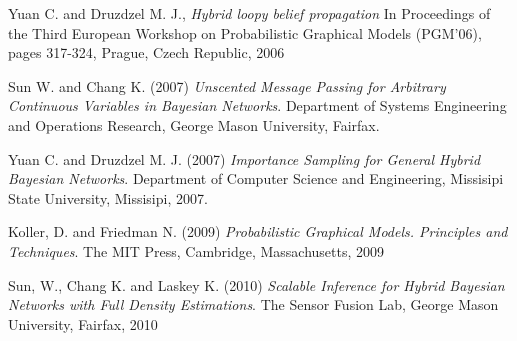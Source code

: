 \documentclass[a4paper,11pt]{article}
\begin{document}
\begin{thebibliography}{}
Yuan C. and Druzdzel M. J., \textit{Hybrid loopy belief propagation} In Proceedings of the Third European Workshop on Probabilistic Graphical Models (PGM'06), pages 317-324, Prague, Czech Republic, 2006

Sun W. and Chang K. (2007) \textit{Unscented Message Passing for Arbitrary Continuous Variables in Bayesian Networks}. Department of Systems Engineering and Operations Research, George Mason University, Fairfax.

Yuan C. and Druzdzel M. J. (2007) \textit{Importance Sampling for General Hybrid Bayesian Networks}. Department of Computer Science and Engineering, Missisipi State University, Missisipi, 2007.

Koller, D. and Friedman N. (2009) \textit{Probabilistic Graphical Models. Principles and Techniques}. The MIT Press, Cambridge, Massachusetts, 2009

Sun, W., Chang K. and Laskey K. (2010) \textit{Scalable Inference for Hybrid Bayesian Networks with Full Density Estimations}. The Sensor Fusion Lab, George Mason University, Fairfax, 2010


\end{thebibliography}
\end{document}
